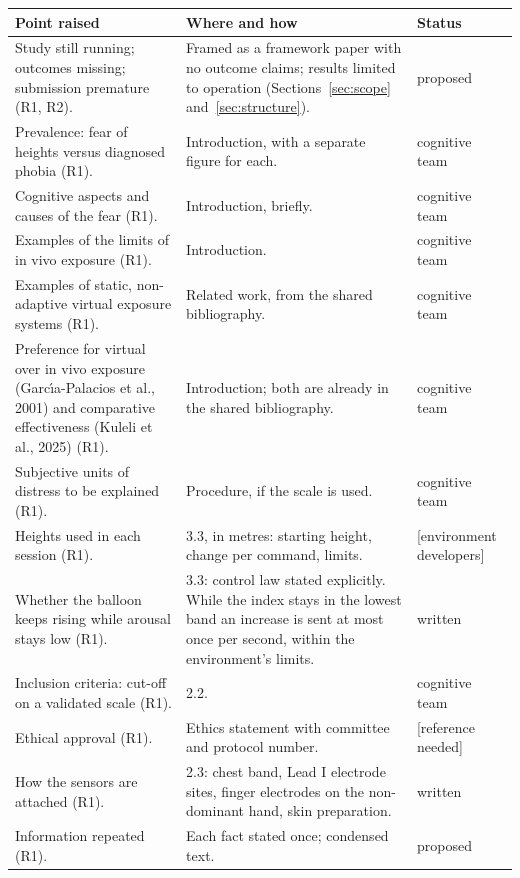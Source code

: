 \documentclass[11pt,a4paper]{article}
\newcommand{\ph}[1]{\textcolor{red!65!black}{[#1]}}
\begin{document}
\begin{longtable}{@{}L{5.6cm}L{7.4cm}L{2.6cm}@{}}
\toprule
\textbf{Point raised} & \textbf{Where and how} & \textbf{Status} \\
\midrule
\endhead
\bottomrule
\endfoot
Study still running; outcomes missing; submission premature (R1, R2). &
    Framed as a framework paper with no outcome claims; results limited
    to operation (Sections~\ref{sec:scope} and~\ref{sec:structure}). &
    proposed \\
Prevalence: fear of heights versus diagnosed phobia (R1). &
    Introduction, with a separate figure for each. &
    cognitive team \\
Cognitive aspects and causes of the fear (R1). &
    Introduction, briefly. &
    cognitive team \\
Examples of the limits of in vivo exposure (R1). &
    Introduction. &
    cognitive team \\
Examples of static, non-adaptive virtual exposure systems (R1). &
    Related work, from the shared bibliography. &
    cognitive team \\
Preference for virtual over in vivo exposure (Garc\'{\i}a-Palacios
et al., 2001) and comparative effectiveness (Kuleli et al., 2025) (R1). &
    Introduction; both are already in the shared bibliography. &
    cognitive team \\
Subjective units of distress to be explained (R1). &
    Procedure, if the scale is used. &
    cognitive team \\
Heights used in each session (R1). &
    3.3, in metres: starting height, change per command, limits. &
    \ph{environment developers} \\
Whether the balloon keeps rising while arousal stays low (R1). &
    3.3: control law stated explicitly. While the index stays in the
    lowest band an increase is sent at most once per second, within the
    environment's limits. &
    written \\
Inclusion criteria: cut-off on a validated scale (R1). &
    2.2. &
    cognitive team \\
Ethical approval (R1). &
    Ethics statement with committee and protocol number. &
    \ph{reference needed} \\
How the sensors are attached (R1). &
    2.3: chest band, Lead I electrode sites, finger electrodes on the
    non-dominant hand, skin preparation. &
    written \\
Information repeated (R1). &
    Each fact stated once; condensed text. &
    proposed \\

\end{longtable}
\end{document}
